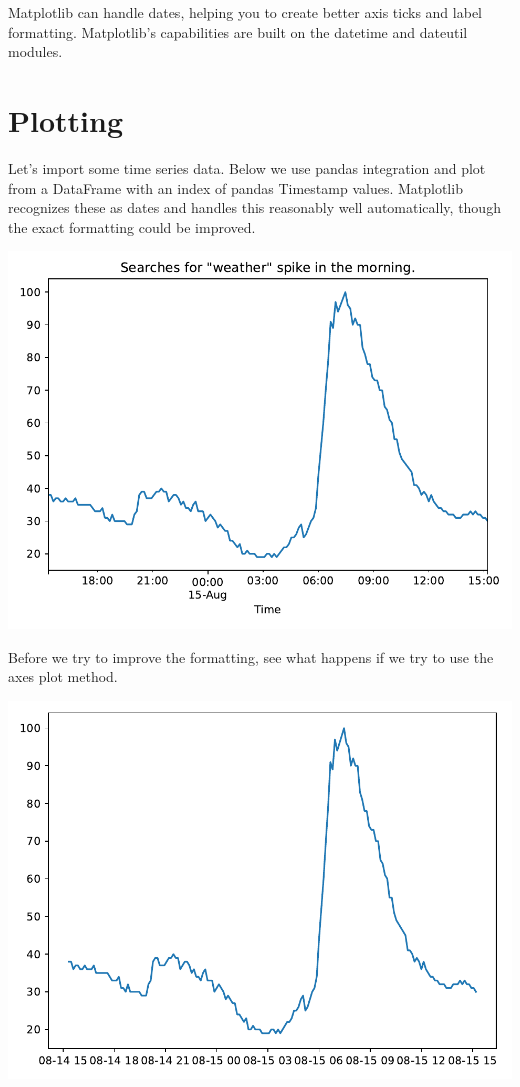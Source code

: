 Matplotlib can handle dates, helping you to create better axis ticks and label formatting. Matplotlib's capabilities are built on the datetime and dateutil modules. 


\section{Plotting}
Let's import some time series data. Below we use pandas integration and plot from a DataFrame with an index of pandas Timestamp values. Matplotlib recognizes these as dates and handles this reasonably well automatically, though the exact formatting could be improved. 


\begin{center}
    \includegraphics[width = .7\textwidth]{figures/proseplots/pd-dates.pdf}
\end{center}

Before we try to improve the formatting, see what happens if we try to use the axes plot method. 


\begin{center}
    \includegraphics[width = .7\textwidth]{figures/proseplots/ax-dates.pdf}
\end{center}


